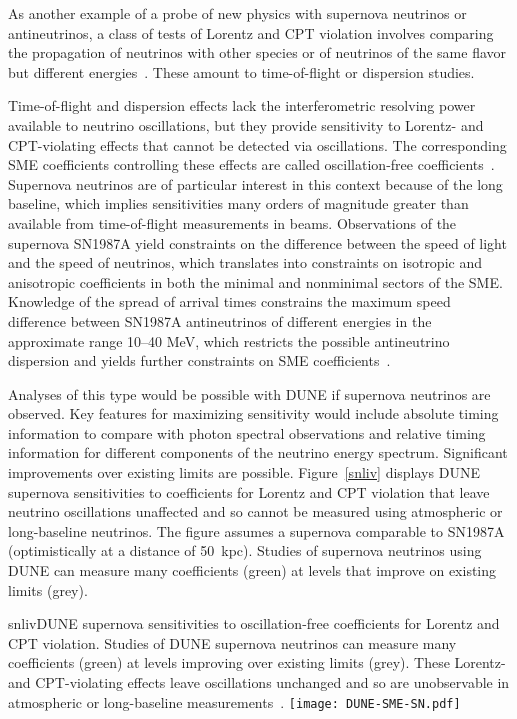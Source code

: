 As another example of a probe of new physics with supernova neutrinos or antineutrinos,
a class of tests of Lorentz and CPT violation involves comparing the propagation of neutrinos with other species or of neutrinos of the same flavor but different energies~\cite{Kostelecky:2003cr,Kostelecky:2003xn,Kostelecky:2011gq,Diaz:2009qk}. These amount to time-of-flight or dispersion studies.

Time-of-flight and dispersion effects lack the interferometric resolving power available to neutrino oscillations, but they provide sensitivity to Lorentz- and CPT-violating effects that cannot be detected via oscillations. The corresponding SME coefficients controlling these effects are called oscillation-free coefficients~\cite{Kostelecky:2011gq}.
Supernova neutrinos are of particular interest in this context because of the long baseline, which implies sensitivities many orders of magnitude greater than available from time-of-flight measurements in beams. Observations of the supernova SN1987A yield constraints on the difference between the speed of light and the speed of neutrinos, which translates into constraints on isotropic and anisotropic coefficients in both the minimal and nonminimal sectors of the SME. Knowledge of the spread of arrival times constrains the maximum speed difference between SN1987A antineutrinos of different energies in the approximate range 10--40 MeV, which restricts the possible antineutrino dispersion and yields further constraints on SME coefficients~\cite{Kostelecky:2011gq}.

Analyses of this type would be possible with DUNE if supernova neutrinos are observed. Key features for maximizing sensitivity would include absolute timing information to compare with photon spectral observations and relative timing information for different components of the neutrino energy spectrum. Significant improvements over existing limits are possible.
Figure~\ref{snliv} displays DUNE supernova sensitivities to coefficients for Lorentz and CPT violation that leave neutrino oscillations unaffected and so cannot be measured using atmospheric or long-baseline neutrinos. The figure assumes a supernova comparable to SN1987A (optimistically at a distance of 50~kpc). Studies of supernova neutrinos using DUNE can measure many coefficients (green) at levels that improve on existing limits (grey).


\begin{cdrfigure}{snliv}{DUNE supernova sensitivities to oscillation-free coefficients for Lorentz and CPT violation. Studies of DUNE supernova neutrinos can measure many coefficients (green) at levels improving over existing limits (grey). These Lorentz- and CPT-violating effects leave oscillations unchanged and so are unobservable in atmospheric or long-baseline measurements~\cite{kostelecky}.}
\texttt{[image: DUNE-SME-SN.pdf]}
\end{cdrfigure}

